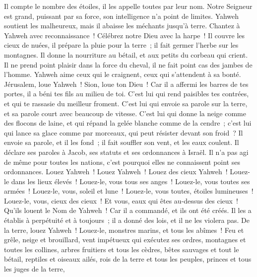 \begin{multicols}{2}
Il compte le nombre des étoiles, il les appelle toutes par leur nom.
Notre Seigneur est grand, puissant par sa force, son intelligence n'a point de limites.
Yahweh soutient les malheureux, mais il abaisse les méchants jusqu'à terre.
Chantez à Yahweh avec reconnaissance~! Célébrez notre Dieu avec la harpe~!
Il couvre les cieux de nuées, il prépare la pluie pour la terre~; il fait germer l'herbe sur les montagnes.
Il donne la nourriture au bétail, et aux petits du corbeau qui crient.
Il ne prend point plaisir dans la force du cheval, il ne fait point cas des jambes de l'homme.
Yahweh aime ceux qui le craignent, ceux qui s'attendent à sa bonté.
Jérusalem, loue Yahweh~! Sion, loue ton Dieu~!
Car il a affermi les barres de tes portes, il a béni tes fils au milieu de toi.
C'est lui qui rend paisibles tes contrées, et qui te rassasie du meilleur froment.
C'est lui qui envoie sa parole sur la terre, et sa parole court avec beaucoup de vitesse.
C'est lui qui donne la neige comme des flocons de laine, et qui répand la gelée blanche comme de la cendre~;
c'est lui qui lance sa glace comme par morceaux, qui peut résister devant son froid~?
Il envoie sa parole, et il les fond~; il fait souffler son vent, et les eaux coulent.
Il déclare ses paroles à Jacob, ses statuts et ses ordonnances à Israël.
Il n'a pas agi de même pour toutes les nations, c'est pourquoi elles ne connaissent point ses ordonnances. Louez Yahweh~!
\VerseOne{}Louez Yahweh~! Louez des cieux Yahweh~! Louez-le dans les lieux élevés~!
Louez-le, vous tous ses anges~! Louez-le, vous toutes ses armées~!
Louez-le, vous, soleil et lune~! Louez-le, vous toutes, étoiles lumineuses~!
Louez-le, vous, cieux des cieux~! Et vous, eaux qui êtes au-dessus des cieux~!
Qu'ils louent le Nom de Yahweh~! Car il a commandé, et ils ont été créés.
Il les a établis à perpétuité et à toujours~; il a donné des lois, et il ne les violera pas.
De la terre, louez Yahweh~! Louez-le, monstres marins, et tous les abîmes~!
Feu et grêle, neige et brouillard, vent impétueux qui exécutez ses ordres,
montagnes et toutes les collines, arbres fruitiers et tous les cèdres,
bêtes sauvages et tout le bétail, reptiles et oiseaux ailés,
rois de la terre et tous les peuples, princes et tous les juges de la terre,

\end{multicols}
